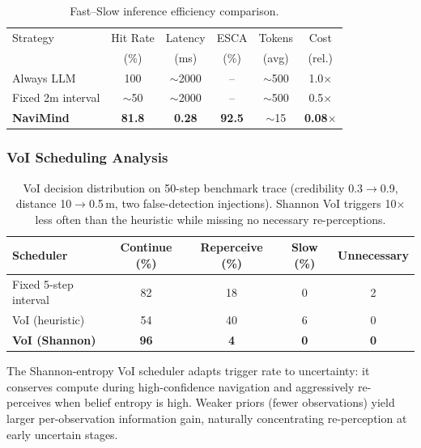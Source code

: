 \documentclass[conference]{IEEEtran}
\begin{document}
\begin{table}[t]
\centering
\caption{Fast--Slow inference efficiency comparison.}
\label{tab:efficiency}
\footnotesize
\begin{tabular}{@{}lccccc@{}}
\toprule
Strategy & Hit Rate & Latency & ESCA & Tokens & Cost \\
         & (\%)     & (ms)    & (\%) & (avg)  & (rel.) \\
\midrule
Always LLM         & 100 & $\sim$2000 & -- & $\sim$500 & 1.0$\times$ \\
Fixed 2m interval   & $\sim$50 & $\sim$2000 & -- & $\sim$500 & 0.5$\times$ \\
\textbf{NaviMind}   & \textbf{81.8} & \textbf{0.28} & \textbf{92.5} & $\sim$15 & \textbf{0.08}$\times$ \\
\bottomrule
\end{tabular}
\vspace{-2mm}
\end{table}


\subsubsection{VoI Scheduling Analysis}

\begin{table}[t]
\centering
\caption{VoI decision distribution on 50-step benchmark trace (credibility 0.3$\to$0.9,
distance 10$\to$0.5\,m, two false-detection injections).
Shannon VoI triggers 10$\times$ less often than the heuristic while missing no necessary re-perceptions.}
\label{tab:voi}
\footnotesize
\begin{tabular}{@{}lcccc@{}}
\toprule
Scheduler & Continue (\%) & Reperceive (\%) & Slow (\%) & Unnecessary \\
\midrule
Fixed 5-step interval  & 82 & 18 & 0 & 2 \\
VoI (heuristic)        & 54 & 40 & 6 & 0 \\
\textbf{VoI (Shannon)} & \textbf{96} & \textbf{4} & \textbf{0} & \textbf{0} \\
\bottomrule
\end{tabular}
\vspace{-2mm}
\end{table}

The Shannon-entropy VoI scheduler adapts trigger rate to uncertainty: it conserves compute during high-confidence navigation and aggressively re-perceives when belief entropy is high.
Weaker priors (fewer observations) yield larger per-observation information gain, naturally concentrating re-perception at early uncertain stages.
\end{document}
